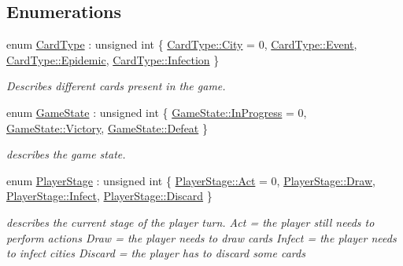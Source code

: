 \subsection*{Enumerations}
\begin{DoxyCompactItemize}
\item 
enum \hyperlink{namespacepan_a1f7350bfd0421afeabe9fa95c16fa811}{Card\+Type} \+: unsigned int \{ \hyperlink{namespacepan_a1f7350bfd0421afeabe9fa95c16fa811a57d056ed0984166336b7879c2af3657f}{Card\+Type\+::\+City} = 0, 
\hyperlink{namespacepan_a1f7350bfd0421afeabe9fa95c16fa811aa4ecfc70574394990cf17bd83df499f7}{Card\+Type\+::\+Event}, 
\hyperlink{namespacepan_a1f7350bfd0421afeabe9fa95c16fa811a62eff626cf0804badc417196cfd09a12}{Card\+Type\+::\+Epidemic}, 
\hyperlink{namespacepan_a1f7350bfd0421afeabe9fa95c16fa811af0ddc0838281faf6d55e2cf840a2a8ef}{Card\+Type\+::\+Infection}
 \}\begin{DoxyCompactList}\small\item\em Describes different cards present in the game. \end{DoxyCompactList}
\item 
enum \hyperlink{namespacepan_a6f99370eda3b27c2bbe19b2dacea9212}{Game\+State} \+: unsigned int \{ \hyperlink{namespacepan_a6f99370eda3b27c2bbe19b2dacea9212a12d868c18cb29bf58f02b504be9033fd}{Game\+State\+::\+In\+Progress} = 0, 
\hyperlink{namespacepan_a6f99370eda3b27c2bbe19b2dacea9212a1f5c647d9066bc9e350b70aa2d16aec4}{Game\+State\+::\+Victory}, 
\hyperlink{namespacepan_a6f99370eda3b27c2bbe19b2dacea9212a570e9d24849e2161b5a969599fb03446}{Game\+State\+::\+Defeat}
 \}\begin{DoxyCompactList}\small\item\em describes the game state. \end{DoxyCompactList}
\item 
enum \hyperlink{namespacepan_a5c203ea0600f2bca14baf8f38e5bac5d}{Player\+Stage} \+: unsigned int \{ \hyperlink{namespacepan_a5c203ea0600f2bca14baf8f38e5bac5da4711d7a59429b7f23fa17419be23bf94}{Player\+Stage\+::\+Act} = 0, 
\hyperlink{namespacepan_a5c203ea0600f2bca14baf8f38e5bac5da2d03c2d5a7ec65ef4619e0582c272ec2}{Player\+Stage\+::\+Draw}, 
\hyperlink{namespacepan_a5c203ea0600f2bca14baf8f38e5bac5dae34d464b3689cee2a87f67e78532749a}{Player\+Stage\+::\+Infect}, 
\hyperlink{namespacepan_a5c203ea0600f2bca14baf8f38e5bac5dad94b42030b9785fd754d5c1754961269}{Player\+Stage\+::\+Discard}
 \}\begin{DoxyCompactList}\small\item\em describes the current stage of the player turn. Act = the player still needs to perform actions Draw = the player needs to draw cards Infect = the player needs to infect cities Discard = the player has to discard some cards \end{DoxyCompactList}

\end{DoxyCompactItemize}
